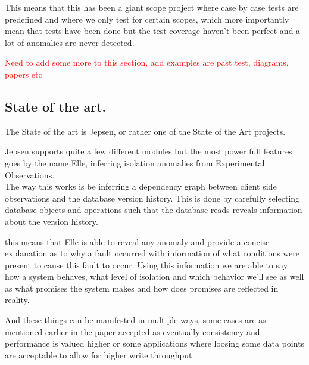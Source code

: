 \documentclass[
  a4paper,  %
  twoside,  %
  bibliography=totoc,
  headsepline,
  cleardoublepage=empty,
  parskip=half,
  draft=false
]{scrbook}
\begin{document}
This means that this has been a giant scope project where case by case tests are predefined and where we only test for certain scopes, which more importantly mean that tests have been done but the test coverage haven't been perfect and a lot of anomalies are never detected.

\textcolor{red}{Need to add some more to this section, add examples are past test, diagrams, papers etc}

\subsection{State of the art.}

The State of the art is Jepsen, or rather one of the State of the Art projects.

Jepsen supports quite a few different modules but the most power full features goes by the name Elle, inferring isolation anomalies from Experimental Observations. \\

The way this works is be inferring a dependency graph between client side observations and the database version history. This is done by carefully selecting database objects and operations such that the database reads reveals information about the version history. 

this means that Elle is able to reveal any anomaly and provide a concise explanation as to why a fault occurred with information of what conditions were present to cause this fault to occur. Using this information we are able to say how a system behaves, what level of isolation and which behavior we'll see as well as what promises the system makes and how does promises are reflected in reality.

And these things can be manifested in multiple ways, some cases are as mentioned earlier in the paper accepted as eventually consistency and performance is valued higher or some applications where loosing some data points are acceptable to allow for higher write throughput.
\end{document}
